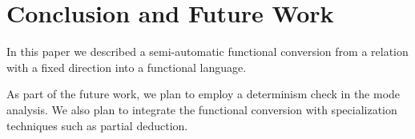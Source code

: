 \section{Conclusion and Future Work}

In this paper we described a semi-automatic functional conversion from a \mk relation with a fixed direction into a functional language.

As part of the future work, we plan to employ a determinism check in the mode analysis.
We also plan to integrate the functional conversion with specialization techniques such as partial deduction.